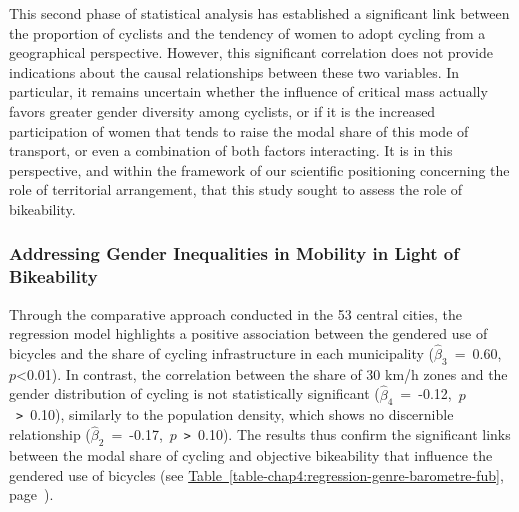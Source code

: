 \begin{refsegment}
This second phase of statistical analysis has established a significant link between the proportion of cyclists and the tendency of women to adopt cycling from a geographical perspective. However, this significant correlation does not provide indications about the causal relationships between these two variables. In particular, it remains uncertain whether the influence of critical mass actually favors greater gender diversity among cyclists, or if it is the increased participation of women that tends to raise the modal share of this mode of transport, or even a combination of both factors interacting. It is in this perspective, and within the framework of our scientific positioning concerning the role of territorial arrangement, that this study sought to assess the role of bikeability. %
    
\subsubsection*{Addressing Gender Inequalities in Mobility in Light of Bikeability
    \label{chap4:cyclabilite-genre}
    }

Through the comparative approach conducted in the 53 central cities, the regression model highlights a positive association between the gendered use of bicycles and the share of cycling infrastructure in each municipality ($\hat{\beta}_{3}$~=~0.60,~$p$\textless0.01). In contrast, the correlation between the share of 30 km/h zones and the gender distribution of cycling is not statistically significant ($\hat{\beta}_{4}$~=~-0.12,~$p$~\texttt{>}~0.10), similarly to the population density, which shows no discernible relationship ($\hat{\beta}_{2}$~=~-0.17,~$p$~\texttt{>}~0.10). The results thus confirm the significant links between the modal share of cycling and objective bikeability \textcolor{blue}{\autocite[8]{codina_built_2022}} that influence the gendered use of bicycles (see \hyperref[table-chap4:regression-genre-barometre-fub]{Table~\ref{table-chap4:regression-genre-barometre-fub}}, page~\pageref{table-chap4:regression-genre-barometre-fub}).%




\end{refsegment}
